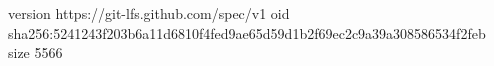 version https://git-lfs.github.com/spec/v1
oid sha256:5241243f203b6a11d6810f4fed9ae65d59d1b2f69ec2c9a39a308586534f2feb
size 5566
